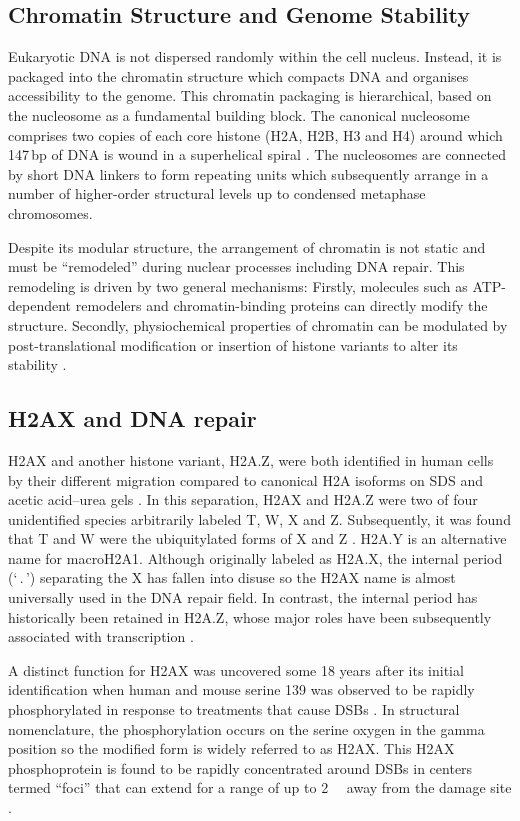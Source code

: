 \subsection{Chromatin Structure and Genome Stability}
Eukaryotic DNA is not dispersed randomly within the cell
nucleus. Instead, it is packaged into the chromatin structure which
compacts DNA and organises accessibility to the genome. This chromatin
packaging is hierarchical, based on the nucleosome as a fundamental
building block. The canonical nucleosome comprises two copies of each
core histone (H2A, H2B, H3 and H4) around which 147\,bp of DNA is
wound in a superhelical spiral \citep{CAD+02}. The nucleosomes are
connected by short DNA linkers to form repeating units which
subsequently arrange in a number of higher-order structural levels up
to condensed metaphase chromosomes.

Despite its modular structure, the arrangement of chromatin is not
static and must be ``remodeled'' during nuclear processes including
DNA repair. This remodeling is driven by two general mechanisms:
Firstly, molecules such as ATP-dependent remodelers and
chromatin-binding proteins can directly modify the
structure. Secondly, physiochemical properties of chromatin can be
modulated by post-translational modification or insertion of histone
variants to alter its stability \citep{GFMG03,JA06}.

\subsection{H2AX and DNA repair}
H2AX and another histone variant, H2A.Z, were both identified in human
cells by their different migration compared to canonical H2A isoforms
on SDS and acetic acid--urea gels \citep{MHPW80}. In this separation,
H2AX and H2A.Z were two of four unidentified species arbitrarily
labeled T, W, X and Z\@. Subsequently, it was found that T and W were
the ubiquitylated forms of X and Z \citep{MHPW80}.
H2A.Y is an alternative name for macroH2A1. Although originally
labeled as H2A.X, the internal period (`\,.\,') separating the X has
fallen into disuse so the H2AX name is almost universally used in the
DNA repair field. In contrast, the internal period has historically
been retained in H2A.Z, whose major roles have been subsequently
associated with transcription \citep{JA06}.

A distinct function for H2AX was uncovered some 18 years after its
initial identification when human and mouse serine 139 was observed to
be rapidly phosphorylated in response to treatments that cause DSBs
\citep{EPR+98}. In structural nomenclature, the phosphorylation occurs
on the serine oxygen in the gamma position so the modified form is
widely referred to as \textgamma H2AX\@. This \textgamma H2AX
phosphoprotein is found to be rapidly concentrated around DSBs in
centers termed ``foci'' that can extend for a range of up to
\SI{2}{\mega\bp} away from the damage site \citep{EPR+99}.


